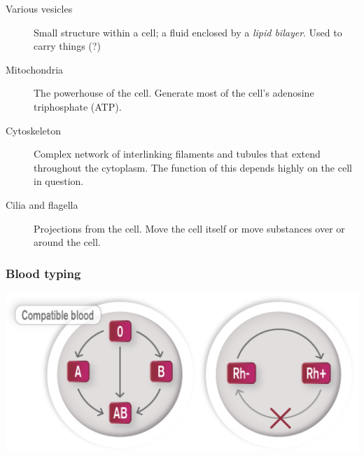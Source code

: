 \documentclass[11pt]{article}
\begin{document}
\begin{description}
\item[{Various vesicles}] Small structure within a cell; a fluid enclosed by a
\emph{lipid bilayer}. Used to carry things (?)

\item[{Mitochondria}] The powerhouse of the cell. Generate most of the cell's
adenosine triphosphate (ATP).

\item[{Cytoskeleton}] Complex network of interlinking filaments and tubules that
extend throughout the cytoplasm. The function of this depends highly on
the cell in question.

\item[{Cilia and flagella}] Projections from the cell. Move the cell itself or
move substances over or around the cell.
\end{description}

\subsubsection{Blood typing}
\label{sec:org1c25245}

\begin{center}
\includegraphics[width=.9\linewidth]{labs/tut3_compatible_blood_2016-09-20_13-13-59.jpg}
\end{center}
\end{document}
